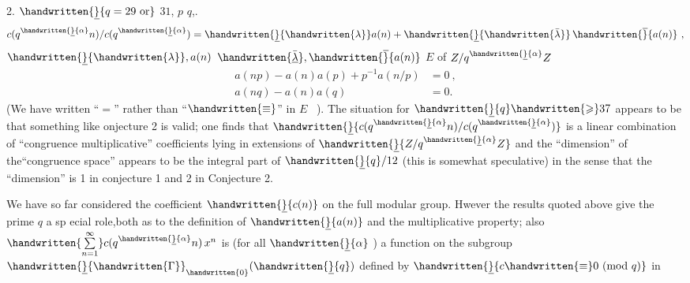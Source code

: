  2. \quad {} $\handwritten{\underline}{q=29\ \text{or}}$ $31$, $p$  $q$,. 
\[
c(q^{\handwritten{\underline}{\alpha}}n)/c(q^{\handwritten{\underline}{\alpha}})=\handwritten{\underline}{\handwritten{\lambda}}a(n)+\handwritten{\underline}{\handwritten{\bar{\lambda}}}\,\handwritten{\overline}{a(n)}\ ,
\]
$\handwritten{\underline}{\handwritten{\lambda}},a(n)$ $\handwritten{\underline{\bar{\lambda}}},\handwritten{\overline}{a(n)}$  $E$ of $Z/q^{\handwritten{\underline}{\alpha}}Z$ 
\[
\begin{aligned}
a(np)-a(n)a(p)+p^{-1}a(n/p)&=0\ ,\\
a(nq)-a(n)a(q)&=0.
\end{aligned}
\]
\margin{\handwritten{\#}}
(We have written ``$=$'' rather than ``$\handwritten{\equiv}$'' in $E$ \ ). The situation for $\handwritten{\underline}{q}\handwritten{\geqslant}37$ appears to be that something like onjecture 2 is valid; one finds that $\handwritten{\underline}{c(q^{\handwritten{\underline}{\alpha}}n)/c(q^{\handwritten{\underline}{\alpha}})}$ is a linear combination of ``congruence multiplicative'' coefficients lying in extensions of $\handwritten{\underline}{Z/q^{\handwritten{\underline}{\alpha}}Z}$ and the ``dimension'' of the``congruence space'' appears to be the integral part of $\handwritten{\underline}{q}/12$ (this is somewhat speculative) in the sense that the ``dimension'' is 1 in conjecture 1 and 2 in Conjecture 2.

We have so far considered the coefficient $\handwritten{\underline}{c(n)}$ on the full modular group. Hwever the results quoted above give the prime $q$ a sp ecial role,both as to the definition of $\handwritten{\underline}{a(n)}$ and the multiplicative property; also $\handwritten{\sum\limits_{n=1}^{\infty}}c(q^{\handwritten{\underline}{\alpha}}n)\,x^{n}$ is (for all $\handwritten{\underline}{\alpha}$ ) a function on the subgroup $\handwritten{\underline}{\handwritten{\Gamma}}_{\handwritten{0}}(\handwritten{\underline}{q})$ defined by $\handwritten{\underline}{c\handwritten{\equiv}0\ (\mathrm{mod}\ q)}$ in

